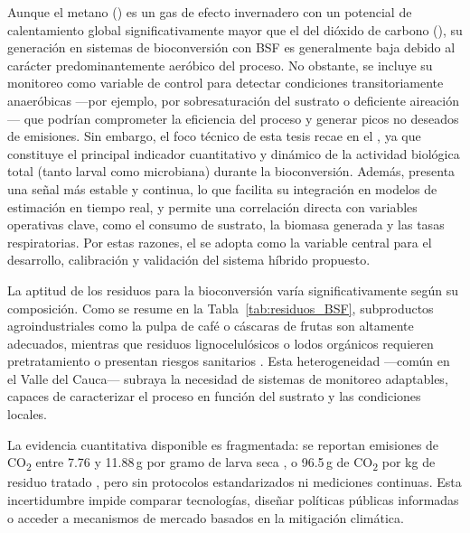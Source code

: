 Aunque el metano () es un gas de efecto invernadero con un potencial de calentamiento global significativamente mayor que el del dióxido de carbono (), su generación en sistemas de bioconversión con BSF es generalmente baja debido al carácter predominantemente aeróbico del proceso. No obstante, se incluye su monitoreo como variable de control para detectar condiciones transitoriamente anaeróbicas ---por ejemplo, por sobresaturación del sustrato o deficiente aireación--- que podrían comprometer la eficiencia del proceso y generar picos no deseados de emisiones. Sin embargo, el foco técnico de esta tesis recae en el , ya que constituye el principal indicador cuantitativo y dinámico de la actividad biológica total (tanto larval como microbiana) durante la bioconversión. Además, presenta una señal más estable y continua, lo que facilita su integración en modelos de estimación en tiempo real, y permite una correlación directa con variables operativas clave, como el consumo de sustrato, la biomasa generada y las tasas respiratorias. Por estas razones, el  se adopta como la variable central para el desarrollo, calibración y validación del sistema híbrido propuesto.

La aptitud de los residuos para la bioconversión varía significativamente según su composición. Como se resume en la Tabla~\ref{tab:residuos_BSF}, subproductos agroindustriales como la pulpa de café o cáscaras de frutas son altamente adecuados, mientras que residuos lignocelulósicos o lodos orgánicos requieren pretratamiento o presentan riesgos sanitarios \parencite{elsayedConversionProteinrichWaste2024a,brunoValorizationOrganicWaste2025}. Esta heterogeneidad —común en el Valle del Cauca— subraya la necesidad de sistemas de monitoreo adaptables, capaces de caracterizar el proceso en función del sustrato y las condiciones locales.

La evidencia cuantitativa disponible es fragmentada: se reportan emisiones de CO\textsubscript{2} entre 7.76 y 11.88\,g por gramo de larva seca \parencite{rossiEstimatingDynamicsGreenhouse2024a}, o 96.5\,g de CO\textsubscript{2} por kg de residuo tratado \parencite{fuhrmannComprehensiveIndustryrelevantBlack2025a}, pero sin protocolos estandarizados ni mediciones continuas. Esta incertidumbre impide comparar tecnologías, diseñar políticas públicas informadas o acceder a mecanismos de mercado basados en la mitigación climática.

